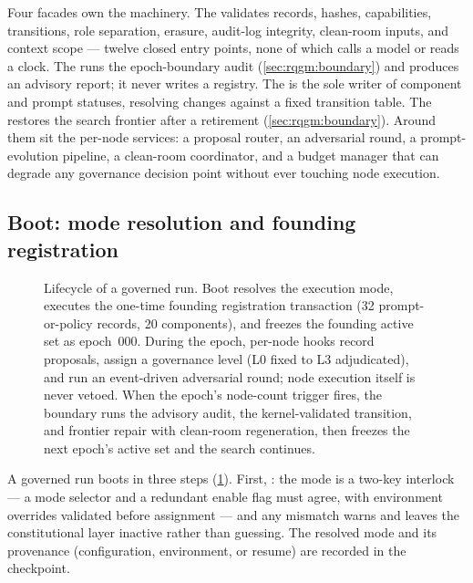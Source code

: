 Four facades own the machinery. The 
validates records, hashes, capabilities, transitions, role
separation, erasure, audit-log integrity, clean-room inputs, and
context scope --- twelve closed entry points, none of which calls a
model or reads a clock. The  runs the
epoch-boundary audit (\cref{sec:rqgm:boundary}) and produces an
advisory report; it never writes a registry. The  is the sole writer of component and prompt
statuses, resolving changes against a fixed transition table. The
 restores the search frontier after a
retirement (\cref{sec:rqgm:boundary}). Around them sit the per-node
services: a proposal router, an adversarial round, a prompt-evolution
pipeline, a clean-room coordinator, and a budget manager that can
degrade any governance decision point without ever touching node
execution.

\subsection{Boot: mode resolution and founding registration}\label{sec:rqgm:boot}

\begin{figure}[t]
  \centering
  \resizebox{\columnwidth}{!}{}
  \caption{Lifecycle of a governed run. Boot resolves the execution
    mode, executes the one-time founding registration transaction (32
    prompt-or-policy records, 20 components), and freezes the founding active set as
    epoch~000. During the epoch, per-node hooks record proposals,
    assign a governance level (L0 fixed to L3 adjudicated), and run
    an event-driven adversarial round; node execution itself is never
    vetoed. When the epoch's node-count trigger fires, the boundary
    runs the advisory audit, the kernel-validated transition, and
    frontier repair with clean-room regeneration, then freezes the
    next epoch's active set and the search continues.}
  \label{fig:rqgm-lifecycle}
\end{figure}

A governed run boots in three steps (\cref{fig:rqgm-lifecycle}).
First, : the mode is a two-key interlock --- a
mode selector and a redundant enable flag must agree, with
environment overrides validated before assignment --- and any
mismatch warns and leaves the constitutional layer inactive rather than
guessing. The resolved mode and its provenance (configuration,
environment, or resume) are recorded in the checkpoint.

